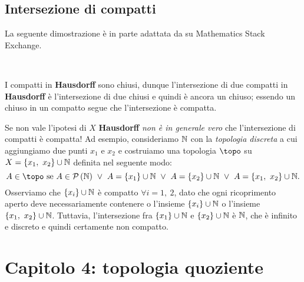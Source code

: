 \subsection{Intersezione di compatti}
La seguente dimostrazione è in parte adattata da \cite{user45861:intersectioncompact} su Mathematics Stack Exchange.
\begin{lemming}~{}\label{intersezione di compatti in hausdorff chiusa}
\end{lemming}
\begin{demonstration}
	I compatti in \textbf{Hausdorff} sono chiusi, dunque l'intersezione di due compatti in \textbf{Hausdorff} è l'intersezione di due chiusi e quindi è ancora un chiuso; essendo un chiuso in un compatto segue che l'intersezione è compatta.
\end{demonstration}
\begin{attention}
	Se non vale l'ipotesi di $X$ \textbf{Hausdorff} \textit{non è in generale vero} che l'intersezione di compatti è compatta! Ad esempio, consideriamo $\mathbb{N}$ con la \textit{topologia discreta} a cui aggiungiamo due punti $x_1$ e $x_2$ e costruiamo una topologia $\topo$ su $X=\left\{x_1,\ x_2\right\}\cup\naturalset$ definita nel seguente modo:
	\begin{equation*}
		A\in\topo \text{ se } A\in\setpart{\naturalset}\ \vee\  A=\left\{x_1\right\}\cup\naturalset\ \vee\  A=\left\{x_2\right\}\cup\naturalset\ \vee\  A=\left\{x_1,\ x_2\right\}\cup\naturalset.
	\end{equation*}
	Osserviamo che $\left\{x_i\right\}\cup\mathbb{N}$ è compatto $\forall i=1,\ 2$, dato che ogni ricoprimento aperto deve necessariamente contenere o l'insieme $\left\{x_i\right\}\cup\mathbb{N}$ o l'insieme $\left\{x_1,\ x_2\right\}\cup\naturalset$. Tuttavia, l'intersezione fra $\left\{x_1\right\}\cup\mathbb{N}$ e $\left\{x_2\right\}\cup\mathbb{N}$ è $\mathbb{N}$, che è infinito e discreto e quindi certamente non compatto.
\end{attention}
\section{Capitolo 4: topologia quoziente}
